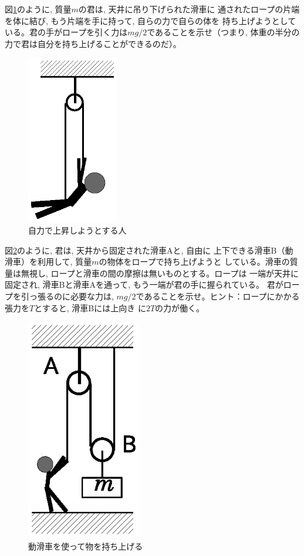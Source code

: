 %
\begin{q}\label{q:force_rope3}
図\ref{fig:string3}のように, 質量$m$の君は, 天井に吊り下げられた滑車に
通されたロープの片端を体に結び, もう片端を手に持って, 自らの力で自らの体を
持ち上げようとしている。君の手がロープを引く力は$mg/2$であることを示せ（つまり, 
体重の半分の力で君は自分を持ち上げることができるのだ）。
\begin{figure}[h]
    \centering
    \includegraphics[width=4cm]{string3.eps}
    \caption{自力で上昇しようとする人}\label{fig:string3}
\end{figure}
\end{q}
\mv

%
\begin{q}\label{q:force_rope4}
図\ref{fig:string4}のように, 君は, 天井から固定された滑車Aと, 自由に
上下できる滑車B（動滑車）を利用して, 質量$m$の物体をロープで持ち上げようと
している。滑車の質量は無視し, ロープと滑車の間の摩擦は無いものとする。ロープは
一端が天井に固定され, 滑車Bと滑車Aを通って, もう一端が君の手に握られている。
君がロープを引っ張るのに必要な力は, 
$mg/2$であることを示せ。ヒント：ロープにかかる張力を$T$とすると, 滑車Bには上向き
に$2T$の力が働く。
\begin{figure}[h]
    \centering
    \includegraphics[width=5cm]{string4.eps}
    \caption{動滑車を使って物を持ち上げる}\label{fig:string4}
\end{figure}
\end{q}

